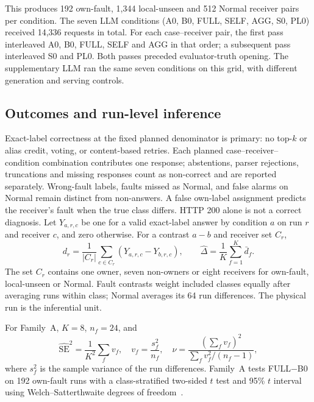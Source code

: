 \documentclass[conference]{IEEEtran}
\newcommand{\cond}[1]{\textsf{#1}}
\begin{document}
This produces 192 own-fault, 1,344 local-unseen and 512 Normal receiver pairs per condition. The seven LLM conditions (\cond{A0}, \cond{B0}, \cond{FULL}, \cond{SELF}, \cond{AGG}, \cond{S0}, \cond{PL0}) received 14,336 requests in total. For each case--receiver pair, the first pass interleaved \cond{A0}, \cond{B0}, \cond{FULL}, \cond{SELF} and \cond{AGG} in that order; a subsequent pass interleaved \cond{S0} and \cond{PL0}. Both passes preceded evaluator-truth opening. The supplementary LLM ran the same seven conditions on this grid, with different generation and serving controls.

\subsection{Outcomes and run-level inference}
Exact-label correctness at the fixed planned denominator is primary: no top-$k$ or alias credit, voting, or content-based retries. Each planned case--receiver--condition combination contributes one response; abstentions, parser rejections, truncations and missing responses count as non-correct and are reported separately. Wrong-fault labels, faults missed as Normal, and false alarms on Normal remain distinct from non-answers. A false own-label assignment predicts the receiver's fault when the true class differs. HTTP 200 alone is not a correct diagnosis. Let $Y_{a,r,c}$ be one for a valid exact-label answer by condition $a$ on run $r$ and receiver $c$, and zero otherwise. For a contrast $a-b$ and receiver set $C_r$,
\begin{equation}
d_r=\frac{1}{|C_r|}\sum_{c\in C_r}(Y_{a,r,c}-Y_{b,r,c}),\qquad
\widehat\Delta=\frac{1}{K}\sum_{f=1}^{K}\bar d_f.
\end{equation}
The set $C_r$ contains one owner, seven non-owners or eight receivers for own-fault, local-unseen or Normal. Fault contrasts weight included classes equally after averaging runs within class; Normal averages its 64 run differences. The physical run is the inferential unit.

For Family~A, $K=8$, $n_f=24$, and
\begin{equation}
\widehat{\mathrm{SE}}^2=\frac{1}{K^2}\sum_f v_f,\quad
v_f=\frac{s_f^2}{n_f},\quad
\nu=\frac{(\sum_f v_f)^2}{\sum_f v_f^2/(n_f-1)},
\end{equation}
where $s_f^2$ is the sample variance of the run differences. Family~A tests \cond{FULL}$-$\cond{B0} on 192 own-fault runs with a class-stratified two-sided $t$ test and 95\% $t$ interval using Welch--Satterthwaite degrees of freedom~\cite{welch1947,satterthwaite1946}.
\end{document}
